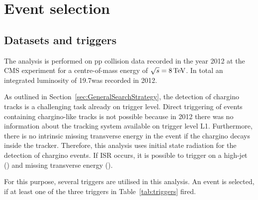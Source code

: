 \chapter{Event selection}
\label{sec:EventSelection}
\section{Datasets and triggers}
\label{sec:DatasetsAndTriggers}

The analysis is performed on pp collision data recorded in the year 2012 at the CMS experiment for a centre-of-mass energy of $\sqrt{s}=8\,\text{Te}\kern-0.06667em\text{V}$.
In total an integrated luminosity of 19.7\fbinv was recorded in 2012.

As outlined in Section~\ref{sec:GeneralSearchStrategy}, the detection of chargino tracks is a challenging task already on trigger level.
Direct triggering of events containing chargino-like tracks is not possible because in 2012 there was no information about the tracking system available on trigger level L1.
Furthermore, there is no intrinsic missing transverse energy in the event if the chargino decays inside the tracker.
Therefore, this analysis uses initial state radiation for the detection of chargino events.
If ISR occurs, it is possible to trigger on a high-\pt jet (\ptfirstjet) and missing transverse energy (\met).

For this purpose, several triggers are utilised in this analysis.
An event is selected, if at least one of the three triggers in Table~\ref{tab:triggers} fired.
%
\renewcommand{\arraystretch}{1.5}
\begin{table}[!hbt]
\centering
\caption{\met and \met+ jet triggers used in this analysis together with the corresponding recorded integrated luminosity during the time when they were in place.}
\label{tab:triggers}
\end{table}  

